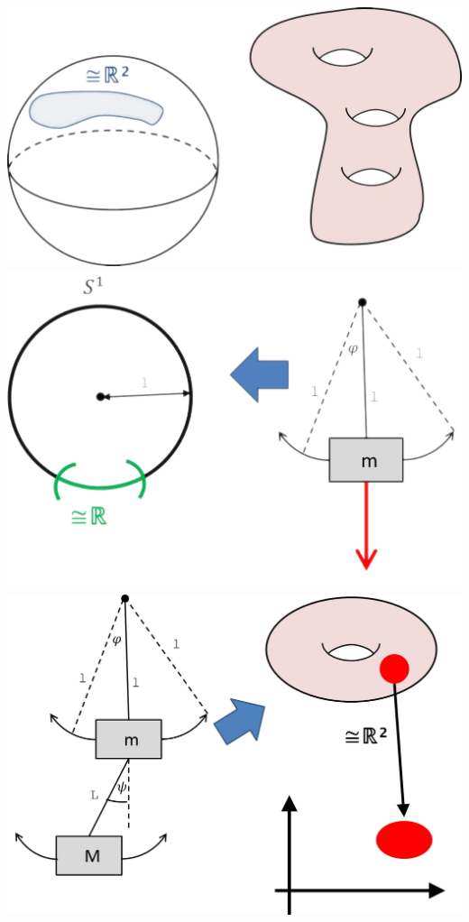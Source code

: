 \documentclass[a4paper,11pt,notitlepage]{report}
\theoremstyle{definition}
\begin{document}
\includegraphics[scale=0.3]{images/Mannigfaltigkeiten1.png} \newline \newline
\includegraphics[scale=0.4]{images/S1_Pendel.png} \newline \newline
\includegraphics[scale=0.4]{images/Torus_Doppelpendel.png} \newline \newline
\end{document}
